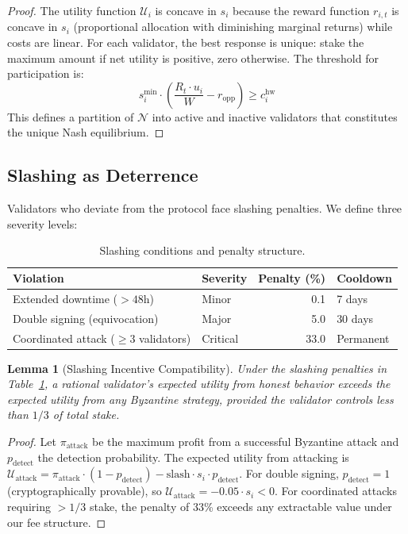 \documentclass[11pt,a4paper]{article}
\newtheorem{lemma}[theorem]{Lemma}
\begin{document}
\begin{proof}
The utility function $\mathcal{U}_i$ is concave in $s_i$ because the reward function $r_{i,t}$ is concave in $s_i$ (proportional allocation with diminishing marginal returns) while costs are linear. For each validator, the best response is unique: stake the maximum amount if net utility is positive, zero otherwise. The threshold for participation is:
\begin{equation}
    s_i^{\min} \cdot \left(\frac{R_t \cdot u_i}{W} - r_{\text{opp}}\right) \geq c_i^{\text{hw}}
\end{equation}
This defines a partition of $\mathcal{N}$ into active and inactive validators that constitutes the unique Nash equilibrium.
\end{proof}

\subsection{Slashing as Deterrence}

Validators who deviate from the protocol face slashing penalties. We define three severity levels:
\begin{table}[H]
\centering
\caption{Slashing conditions and penalty structure.}
\label{tab:slashing}
\begin{tabular}{llrl}
\toprule
\textbf{Violation} & \textbf{Severity} & \textbf{Penalty (\%)} & \textbf{Cooldown} \\
\midrule
Extended downtime ($> 48$h) & Minor & 0.1 & 7 days \\
Double signing (equivocation) & Major & 5.0 & 30 days \\
Coordinated attack ($\geq 3$ validators) & Critical & 33.0 & Permanent \\
\bottomrule
\end{tabular}
\end{table}

\begin{lemma}[Slashing Incentive Compatibility]
Under the slashing penalties in Table~\ref{tab:slashing}, a rational validator's expected utility from honest behavior exceeds the expected utility from any Byzantine strategy, provided the validator controls less than $1/3$ of total stake.
\end{lemma}

\begin{proof}
Let $\pi_{\text{attack}}$ be the maximum profit from a successful Byzantine attack and $p_{\text{detect}}$ the detection probability. The expected utility from attacking is $\mathcal{U}_{\text{attack}} = \pi_{\text{attack}} \cdot (1 - p_{\text{detect}}) - \text{slash} \cdot s_i \cdot p_{\text{detect}}$. For double signing, $p_{\text{detect}} = 1$ (cryptographically provable), so $\mathcal{U}_{\text{attack}} = -0.05 \cdot s_i < 0$. For coordinated attacks requiring $> 1/3$ stake, the penalty of 33\% exceeds any extractable value under our fee structure.
\end{proof}
\end{document}

